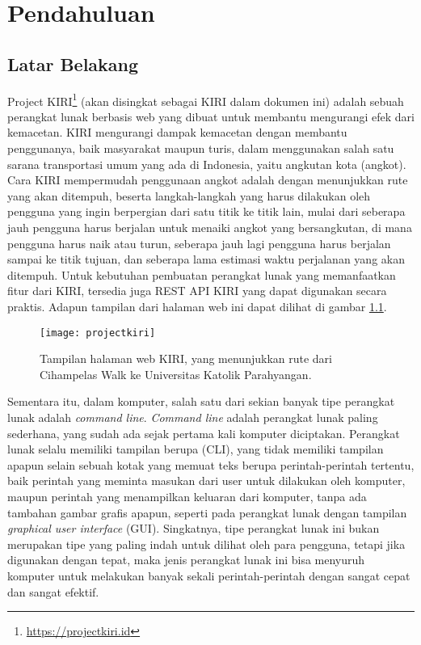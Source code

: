 \chapter{Pendahuluan}
\label{chap:intro}
   
\section{Latar Belakang}
\label{sec:label}
Project KIRI\footnote{\href{https://projectkiri.id}{https://projectkiri.id}} (akan disingkat sebagai KIRI dalam dokumen ini) adalah sebuah perangkat lunak berbasis web yang dibuat untuk \mbox{membantu} mengurangi efek dari kemacetan. KIRI mengurangi dampak kemacetan dengan membantu penggunanya, baik \mbox{masyarakat} maupun turis, dalam menggunakan salah satu sarana transportasi umum yang ada di Indonesia, yaitu angkutan kota (angkot). Cara KIRI \mbox{mempermudah} penggunaan angkot adalah dengan menunjukkan rute yang akan ditempuh, beserta langkah-langkah yang harus dilakukan oleh pengguna yang ingin berpergian dari satu titik ke titik lain, mulai dari seberapa jauh pengguna harus berjalan untuk menaiki angkot yang bersangkutan, di mana pengguna harus naik atau turun, seberapa jauh lagi pengguna harus berjalan sampai ke titik tujuan, dan seberapa lama estimasi waktu perjalanan yang akan ditempuh. Untuk kebutuhan pembuatan perangkat lunak yang memanfaatkan fitur dari KIRI, tersedia juga REST API KIRI yang dapat digunakan secara praktis. Adapun tampilan dari halaman web ini dapat dilihat di gambar \ref{fig:kiripage}. 

\begin{figure}[ht]
    \centering
    \texttt{[image: projectkiri]}
    \caption[Tampilan halaman web KIRI]{Tampilan halaman web KIRI, yang menunjukkan rute dari Cihampelas Walk ke Universitas Katolik Parahyangan.}
    \label{fig:kiripage}
\end{figure}

Sementara itu, dalam komputer, salah satu dari sekian banyak tipe perangkat lunak adalah \textit{command line}. \textit{\mbox{Command} line} adalah perangkat lunak paling sederhana, yang sudah ada sejak pertama kali komputer \mbox{diciptakan}. Perangkat lunak selalu memiliki tampilan berupa \cli (CLI), yang \mbox{tidak} \mbox{memiliki} tampilan apapun selain sebuah kotak yang memuat teks berupa perintah-perintah tertentu, \mbox{baik} perintah yang meminta masukan dari user untuk dilakukan oleh komputer, maupun perintah yang menampilkan keluaran dari komputer, tanpa ada tambahan gambar grafis apapun, seperti pada perangkat lunak dengan tampilan \textit{graphical user interface} (GUI). Singkatnya, tipe perangkat lunak ini bukan merupakan tipe yang paling indah untuk dilihat oleh para pengguna, tetapi jika digunakan dengan tepat, maka \mbox{jenis} \mbox{perangkat} lunak ini bisa menyuruh komputer untuk melakukan banyak sekali perintah-perintah dengan sangat cepat dan sangat efektif.

